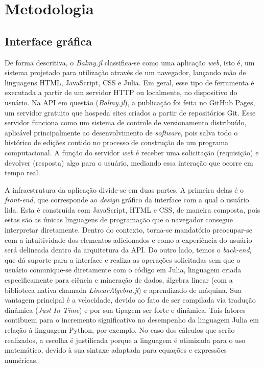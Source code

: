\chapter{Metodologia
}\label{cap:desenvolvimento}
\section{Interface gráfica}

De forma descritiva, o \textit{Balmy.jl} classifica-se como uma aplicação \textit{web}, isto é, um sistema projetado para utilização através de um navegador, lançando mão de linguagens \gls{HTML}, JavaScript, \gls{CSS} e Julia. Em geral, esse tipo de ferramenta é executada a partir de um servidor \gls{HTTP} ou localmente, no dispositivo do usuário. Na \gls{API} em questão (\textit{Balmy.jl}), a publicação foi feita no GitHub Pages, um servidor gratuito que hospeda sites criados a partir de repositórios Git. Esse servidor funciona como um sistema de controle de versionamento distribuído, aplicável principalmente ao desenvolvimento de \textit{software}, pois salva todo o histórico de edições contido no processo de construção de um programa computacional. A função do servidor \textit{web} é receber uma solicitação (requisição) e devolver (resposta) algo para o usuário, mediando essa interação que ocorre em tempo real. 

A infraestrutura da aplicação divide-se em duas partes. A primeira delas é o \textit{front-end}, que corresponde ao \textit{design} gráfico da interface com a qual o usuário lida. Esta é construída com JavaScript, \gls{HTML} e \gls{CSS}, de maneira composta, pois estas são as únicas linguagens de programação que o navegador consegue interpretar diretamente. Dentro do contexto, torna-se mandatório preocupar-se com a intuitividade dos elementos adicionados e como a experiência do usuário será delineada dentro da arquitetura da API. Do outro lado, temos o \textit{back-end}, que dá suporte para a interface e realiza as operações solicitadas sem que o usuário comunique-se diretamente com o código em Julia, linguagem criada especificamente para ciência e mineração de dados, álgebra linear (com a biblioteca nativa chamada \textit{LinearAlgebra.jl}) e aprendizado de máquina. Sua vantagem principal é a velocidade, devido ao fato de ser compilada via tradução dinâmica (\textit{Just In Time}) e por sua tipagem ser forte e dinâmica. Tais fatores contibuem para o incremento significativo no desempenho da linguagem Julia em relação à linguagem Python, por exemplo. No caso dos cálculos que serão realizados, a escolha é justificada porque a linguagem é otimizada para o uso matemático, devido à sua sintaxe adaptada para equações
e expressões numéricas.

